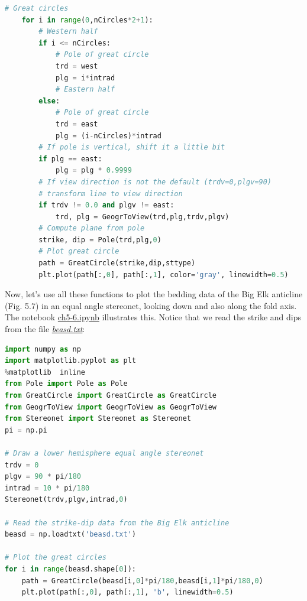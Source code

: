 \documentclass[a4paper , 12pt]{book}
\begin{document}
\begin{lstlisting}[language=Python, frame=single]
    # Great circles
    for i in range(0,nCircles*2+1):
        # Western half
        if i <= nCircles:
            # Pole of great circle
            trd = west
            plg = i*intrad
            # Eastern half
        else:
            # Pole of great circle
            trd = east
            plg = (i-nCircles)*intrad
        # If pole is vertical, shift it a little bit
        if plg == east:
            plg = plg * 0.9999
        # If view direction is not the default (trdv=0,plgv=90)
        # transform line to view direction
        if trdv != 0.0 and plgv != east:
            trd, plg = GeogrToView(trd,plg,trdv,plgv)
        # Compute plane from pole
        strike, dip = Pole(trd,plg,0)
        # Plot great circle
        path = GreatCircle(strike,dip,sttype)
        plt.plot(path[:,0], path[:,1], color='gray', linewidth=0.5)
\end{lstlisting}

Now, let's use all these functions to plot the bedding data of the Big Elk anticline (Fig. 5.7) in an equal angle stereonet, looking down and also along the fold axis. The notebook \href{http://github.com}{ch5-6.ipynb} illustrates this. Notice that we read the strike and dips from the file \href{http://github.com}{\textit{beasd.txt}}:

\begin{center}
\begin{lstlisting}[language=Python, frame=single]
import numpy as np
import matplotlib.pyplot as plt
%matplotlib  inline
from Pole import Pole as Pole
from GreatCircle import GreatCircle as GreatCircle
from GeogrToView import GeogrToView as GeogrToView
from Stereonet import Stereonet as Stereonet
pi = np.pi

# Draw a lower hemisphere equal angle stereonet
trdv = 0
plgv = 90 * pi/180
intrad = 10 * pi/180
Stereonet(trdv,plgv,intrad,0)

# Read the strike-dip data from the Big Elk anticline
beasd = np.loadtxt('beasd.txt')

# Plot the great circles
for i in range(beasd.shape[0]):
    path = GreatCircle(beasd[i,0]*pi/180,beasd[i,1]*pi/180,0)
    plt.plot(path[:,0], path[:,1], 'b', linewidth=0.5) 
\end{lstlisting}
\end{center}
\end{document}
